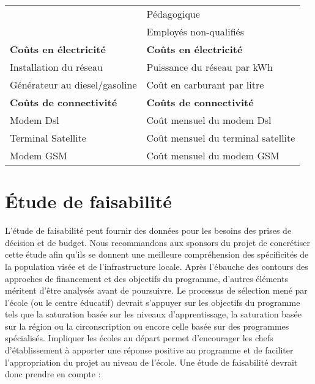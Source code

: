 \documentclass[11pt]{article}
\begin{document}
\begin{longtable}{|l|l|}
                                                   &  Pédagogique                                        \\
                                                   &  Employés non-qualifiés                             \\
\hline
 \textbf{Coûts en électricité}                     &  \textbf{Coûts en électricité}                      \\
 Installation du réseau                            &  Puissance du réseau par kWh                        \\
 Générateur au diesel/gasoline                     &  Coût en carburant par litre                        \\
\hline
 \textbf{Coûts de connectivité}                    &  \textbf{Coûts de connectivité}                     \\
 Modem Dsl                                         &  Coût mensuel du modem Dsl                          \\
 Terminal Satellite                                &  Coût mensuel du terminal satellite                 \\
 Modem GSM                                         &  Coût mensuel du modem GSM                          \\
\hline
\end{longtable}
\section{Étude de faisabilité}
\label{sec-7}


L'étude de faisabilité peut fournir des données pour les besoins des prises
de décision et de budget. Nous recommandons aux sponsors du projet de
concrétiser cette étude afin qu'ils se donnent une meilleure compréhension
des spécificités de la population visée et de l'infrastructure
locale. Après l'ébauche des contours des approches de financement et des
objectifs du programme, d'autres éléments méritent d'être analysés avant de
poursuivre. Le processus de sélection mené par l'école (ou le centre
éducatif) devrait s'appuyer sur les objectifs du programme tels que la
saturation basée sur les niveaux d'apprentissage, la saturation basée sur
la région ou la circonscription ou encore celle basée sur des programmes
spécialisés. Impliquer les écoles au départ permet  d'encourager les chefs
d'établissement à apporter une réponse positive au programme et de
faciliter l'appropriation du projet au niveau de l'école. Une étude de
faisabilité devrait donc prendre en compte :
\end{document}
